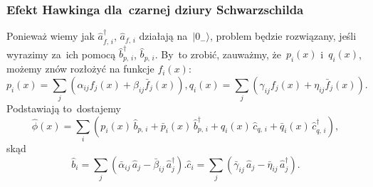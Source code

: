 \documentclass[10pt,t]{beamer}
\begin{document}
\begin{frame}
  \frametitle{Efekt Hawkinga dla~czarnej dziury Schwarzschilda}


  Ponieważ wiemy jak $\widehat{ a }_{ f,\, i }^{ \dagger }$,
  $\widehat{ a }_{ f,\, i }$ działają na~$| 0_{ - } \rangle$,
  problem będzie rozwiązany, jeśli wyrazimy za~ich pomocą
  $\widehat{ b }_{ p,\, i }^{ \dagger }$,
  $\widehat{ b }_{ p,\, i }$. By~to zrobić, zauważmy,
  że~$p_{ i }( x )$ i~$q_{ i }( x )$, możemy znów rozłożyć na
  funkcje $f_{ i }( x )$:
  \begin{subequations}
    \begin{equation}
      \label{eq:Promieniowanie-Hawkinga-20a}
      p_{ i }( x )
      = \sum_{ j }( \alpha_{ i j } f_{ j }( x ) + \beta_{ i j }
      \bar{ f }_{ j }( x ) ),
    \end{equation}
    \begin{equation}
      \label{eq:Promieniowanie-Hawkinga-20b}
      q_{ i }( x ) = \sum_{ j }( \gamma_{ i j } f_{ j }( x )
      + \eta_{ i j } \bar{ f }_{ j }( x ) ).
    \end{equation}
  \end{subequations}
  Podstawiają to~dostajemy
  \begin{equation}
    \label{eq:Promieniowanie-Hawkinga-21}
    \widehat{ \phi }( x )
    = \sum_{ i }( p_{ i }( x )\, \widehat{ b }_{ p,\, i }
    + \bar{ p }_{ i }( x )\, \widehat{ b }^{ \dagger }_{ p,\, i }
    + q_{ i }( x )\, \widehat{ c }_{ q,\, i }
    + \bar{ q }_{ i }( x )\, \widehat{ c }^{ \dagger }_{ q,\, i } ),
  \end{equation}
  skąd
  \begin{subequations}
    \begin{equation}
      \label{eq:Promieniowanie-Hawkinga-22a}
      \widehat{ b }_{ i } = \sum_{ j }( \bar{ \alpha }_{ i j }\,
      \widehat{ a }_{ j } - \bar{ \beta }_{ i j }\,
      \widehat{ a }^{ \dagger }_{ j } ).
    \end{equation}
    \begin{equation}
      \label{eq:Promieniowanie-Hawkinga-22b}
      \widehat{ c }_{ i } = \sum_{ j }( \bar{ \gamma }_{ i j }\,
      \widehat{ a }_{ j }
      - \bar{ \eta }_{ i j }\, \widehat{ a }^{ \dagger }_{ j } ).
    \end{equation}
  \end{subequations}

\end{frame}
\end{document}
